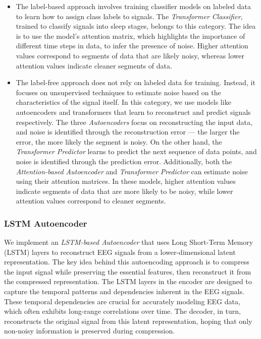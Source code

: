 \begin{itemize}
    \item The label-based approach involves training classifier models on labeled data to learn how to assign class labels to signals. The \emph{Transformer Classifier}, trained to classify signals into sleep stages, belongs to this category. The idea is to use the model’s attention matrix, which highlights the importance of different time steps in data, to infer the presence of noise. Higher attention values correspond to segments of data that are likely noisy, whereas lower attention values indicate cleaner segments of data.
    \vspace{-0.2cm}
    \item The label-free approach does not rely on labeled data for training. Instead, it focuses on unsupervised techniques to estimate noise based on the characteristics of the signal itself. In this category, we use models like autoencoders and transformers that learn to reconstruct and predict signals respectively. The three \emph{Autoencoders} focus on reconstructing the input data, and noise is identified through the reconstruction error — the larger the error, the more likely the segment is noisy. On the other hand, the \emph{Transformer Predictor} learns to predict the next sequence of data points, and noise is identified through the prediction error. Additionally, both the \emph{Attention-based Autoencoder} and \emph{Transformer Predictor} can estimate noise using their attention matrices. In these models, higher attention values indicate segments of data that are more likely to be noisy, while lower attention values correspond to cleaner segments.
\end{itemize}

\subsubsection{LSTM Autoencoder}

We implement an \emph{LSTM-based Autoencoder} that uses Long Short-Term Memory (LSTM) layers to reconstruct EEG signals from a lower-dimensional latent representation. The key idea behind this autoencoding approach is to compress the input signal while preserving the essential features, then reconstruct it from the compressed representation. The LSTM layers in the encoder are designed to capture the temporal patterns and dependencies inherent in the EEG signals. These temporal dependencies are crucial for accurately modeling EEG data, which often exhibits long-range correlations over time. The decoder, in turn, reconstructs the original signal from this latent representation, hoping that only non-noisy information is preserved during compression.

